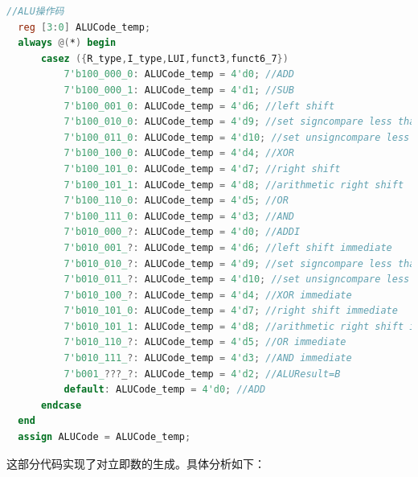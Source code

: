 \documentclass[12pt,hyperref,a4paper,UTF8]{ctexart}
\begin{document}
\begin{lstlisting}[language=Verilog,caption=ALUcode确定]
  //ALU操作码
  reg [3:0] ALUCode_temp;
  always @(*) begin
      casez ({R_type,I_type,LUI,funct3,funct6_7})
          7'b100_000_0: ALUCode_temp = 4'd0; //ADD
          7'b100_000_1: ALUCode_temp = 4'd1; //SUB
          7'b100_001_0: ALUCode_temp = 4'd6; //left shift
          7'b100_010_0: ALUCode_temp = 4'd9; //set signcompare less than
          7'b100_011_0: ALUCode_temp = 4'd10; //set unsigncompare less than
          7'b100_100_0: ALUCode_temp = 4'd4; //XOR
          7'b100_101_0: ALUCode_temp = 4'd7; //right shift
          7'b100_101_1: ALUCode_temp = 4'd8; //arithmetic right shift
          7'b100_110_0: ALUCode_temp = 4'd5; //OR
          7'b100_111_0: ALUCode_temp = 4'd3; //AND
          7'b010_000_?: ALUCode_temp = 4'd0; //ADDI
          7'b010_001_?: ALUCode_temp = 4'd6; //left shift immediate
          7'b010_010_?: ALUCode_temp = 4'd9; //set signcompare less than immediate
          7'b010_011_?: ALUCode_temp = 4'd10; //set unsigncompare less than immediate
          7'b010_100_?: ALUCode_temp = 4'd4; //XOR immediate
          7'b010_101_0: ALUCode_temp = 4'd7; //right shift immediate
          7'b010_101_1: ALUCode_temp = 4'd8; //arithmetic right shift immediate
          7'b010_110_?: ALUCode_temp = 4'd5; //OR immediate
          7'b010_111_?: ALUCode_temp = 4'd3; //AND immediate
          7'b001_???_?: ALUCode_temp = 4'd2; //ALUResult=B
          default: ALUCode_temp = 4'd0; //ADD
      endcase
  end
  assign ALUCode = ALUCode_temp;
\end{lstlisting}

这部分代码实现了对立即数的生成。具体分析如下：
\end{document}
